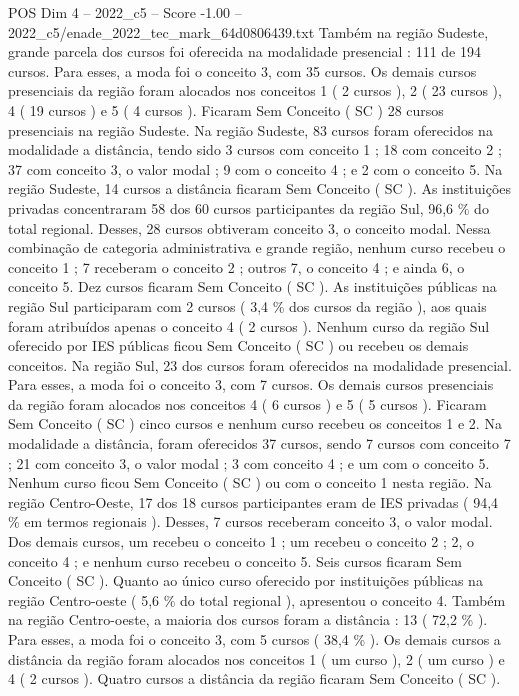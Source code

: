 \begin{textsample}{POS Dim 4 – 2022\_c5 – Score -1.00 – 2022\_c5/enade\_2022\_tec\_mark\_64d0806439.txt}
Também na região Sudeste, grande parcela dos cursos foi oferecida na modalidade presencial : 111 de 194 cursos.
Para esses, a moda foi o conceito 3, com 35 cursos.
Os demais cursos presenciais da região foram alocados nos conceitos 1 ( 2 cursos ), 2 ( 23 cursos ), 4 ( 19 cursos ) e 5 ( 4 cursos ).
Ficaram Sem Conceito ( SC ) 28 cursos presenciais na região Sudeste.
Na região Sudeste, 83 cursos foram oferecidos na modalidade a distância, tendo sido 3 cursos com conceito 1 ; 18 com conceito 2 ; 37 com conceito 3, o valor modal ; 9 com o conceito 4 ; e 2 com o conceito 5.
Na região Sudeste, 14 cursos a distância ficaram Sem Conceito ( SC ).
As instituições privadas concentraram 58 dos 60 cursos participantes da região Sul, 96,6 \% do total regional.
Desses, 28 cursos obtiveram conceito 3, o conceito modal.
Nessa combinação de categoria administrativa e grande região, nenhum curso recebeu o conceito 1 ; 7 receberam o conceito 2 ; outros 7, o conceito 4 ; e ainda 6, o conceito 5.
Dez cursos ficaram Sem Conceito ( SC ).
As instituições públicas na região Sul participaram com 2 cursos ( 3,4 \% dos cursos da região ), aos quais foram atribuídos apenas o conceito 4 ( 2 cursos ).
Nenhum curso da região Sul oferecido por IES públicas ficou Sem Conceito ( SC ) ou recebeu os demais conceitos.
Na região Sul, 23 dos cursos foram oferecidos na modalidade presencial.
Para esses, a moda foi o conceito 3, com 7 cursos.
Os demais cursos presenciais da região foram alocados nos conceitos 4 ( 6 cursos ) e 5 ( 5 cursos ).
Ficaram Sem Conceito ( SC ) cinco cursos e nenhum curso recebeu os conceitos 1 e 2.
Na modalidade a distância, foram oferecidos 37 cursos, sendo 7 cursos com conceito 7 ; 21 com conceito 3, o valor modal ; 3 com conceito 4 ; e um com o conceito 5.
Nenhum curso ficou Sem Conceito ( SC ) ou com o conceito 1 nesta região.
Na região Centro-Oeste, 17 dos 18 cursos participantes eram de IES privadas ( 94,4 \% em termos regionais ).
Desses, 7 cursos receberam conceito 3, o valor modal.
Dos demais cursos, um recebeu o conceito 1 ; um recebeu o conceito 2 ; 2, o conceito 4 ; e nenhum curso recebeu o conceito 5.
Seis cursos ficaram Sem Conceito ( SC ).
Quanto ao único curso oferecido por instituições públicas na região Centro-oeste ( 5,6 \% do total regional ), apresentou o conceito 4.
Também na região Centro-oeste, a maioria dos cursos foram a distância : 13 ( 72,2 \% ).
Para esses, a moda foi o conceito 3, com 5 cursos ( 38,4 \% ).
Os demais cursos a distância da região foram alocados nos conceitos 1 ( um curso ), 2 ( um curso ) e 4 ( 2 cursos ).
Quatro cursos a distância da região ficaram Sem Conceito ( SC ).

\end{textsample}
